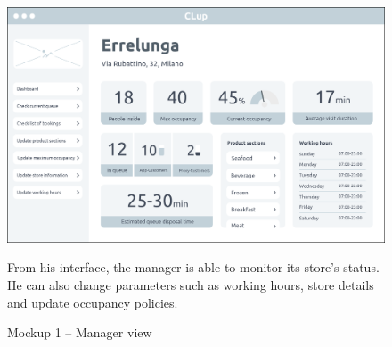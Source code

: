 \documentclass[a4paper,oneside,11pt]{book}   %
\begin{document}
    \begin{figure}[H]
        \centering
        \includegraphics[width=.97\textwidth, height=\textheight, keepaspectratio]{pictures/mockups/manager_view}
        \caption{Mockup 1 -- Manager view}{From his interface, the manager is able to monitor its store's status. He can also change parameters such as working hours, store details and update occupancy policies.}
        \label{figure:mockup_1_manager}
    \end{figure}
    
\end{document}
